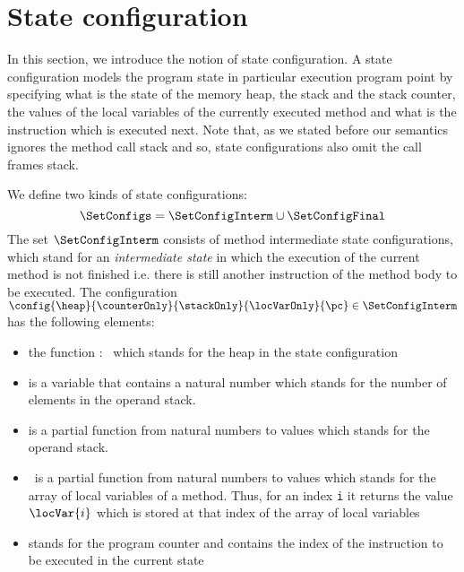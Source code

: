
\newtheorem{StateProp0}{Substitution Property for Expressions}
\newtheorem{StateProp1}[StateProp0]{Substitution Property for Formulas}
\newtheorem{UpdateStateSem}[StateProp0]{Definition}


\newtheorem{AtState}{Definition}


\newtheorem{FormulaInterp}[AtState]{Definition}
\newtheorem{StateProp2}[AtState]{Substitution Property for Field Functions } %


\section{State configuration}\label{def}
 In this section, we introduce the notion of state configuration.
 A state configuration \SetConfigs models the program state in particular execution
 program point by specifying what is the state of the memory heap, the stack and the stack counter, the values of the
 local variables of the currently executed method  and what is the instruction which is executed next. Note that, as we stated before our 
 semantics ignores the method call stack and so, state configurations also omit the call frames stack. 
 
 We define two kinds of state configurations:
 $$\SetConfigs = \SetConfigInterm \cup \SetConfigFinal$$
 The set $\SetConfigInterm$ consists of method intermediate state configurations, which stand for an 
 \textit{intermediate state} in which the execution of the current method is not finished i.e.
 there is still another instruction of the method body to be executed.  
 The configuration $\config{\heap}{\counterOnly}{\stackOnly}{\locVarOnly}{\pc} \in \SetConfigInterm$ has the following elements:
               \begin{itemize}
                     \item the function \heap : \HeapSet \ which stands for the heap in the state configuration
	   
	             \item \counterOnly is a variable that contains a natural number which stands for the number of
		     elements in the operand stack.  

		     \item \stackOnly is a partial function from natural numbers to values  which  stands for 
		     the operand stack.

	             \item \locVarOnly \ is a partial function from natural numbers to values which stands for
		     the array of local variables of a method.
		     Thus,  for an index \texttt{i} it returns the value $\locVar{i}$ which is stored at that 
		     index of the array of local variables
	
	            \item \pc stands for the program counter and contains the index of the instruction to be executed in the current state
	        \end{itemize}


